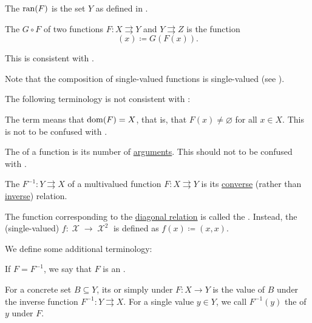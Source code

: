 \begin{definition}
\begin{DefEnum}[resume=def:function]
     The  \( \operatorname{ran}(F) \) is the set \( Y \) as defined in .

     The  \( G \circ F \) of two functions \( F: X \rightrightarrows Y \) and \( Y \rightrightarrows Z \) is the function
    \begin{equation*}
      [G \circ F](x) \coloneqq G(F(x)).
    \end{equation*}

    This is consistent with .

    Note that the composition of single-valued functions is single-valued (see ).
  \end{DefEnum}

  The following terminology is not consistent with :
  \begin{DefEnum}[resume=def:function]
     The term  means that \( \operatorname{dom}(F) = X \), that is, that \( F(x) \neq \varnothing \) for all \( x \in X \). This is not to be confused with .

     The  of a function is its number of \hyperref[def:function/arity]{arguments}. This should not to be confused with .

     The  \( F^{-1}: Y \rightrightarrows X \) of a multivalued function \( F: X \rightrightarrows Y \) is its \hyperref[def:binary_relation/converse]{converse} (rather than \hyperref[def:binary_relation/inverse]{inverse}) relation.

     The function corresponding to the \hyperref[def:binary_relation/diagonal]{diagonal relation} is called the . Instead, the (single-valued)  \( f: \mscrX \to \mscrX^2 \) is defined as \( f(x) \coloneqq (x, x) \).
  \end{DefEnum}

  We define some additional terminology:
  \begin{DefEnum}[resume=def:function]
     If \( F = F^{-1} \), we say that \( F \) is an .

     For a concrete set \( B \subseteq Y \), its  or simply  under \( F: X \to Y \) is the value of \( B \) under the inverse function \( F^{-1}: Y \rightrightarrows X \). For a single value \( y \in Y \), we call \( F^{-1}(y) \) the  of \( y \) under \( F \).


\end{DefEnum}
\end{definition}
